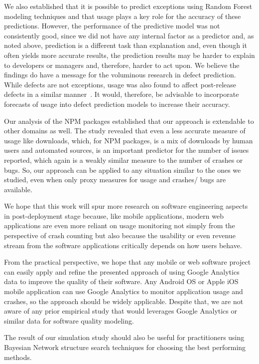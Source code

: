 \documentclass[smallcondensed]{svjour3}     %
\begin{document}
We also established
that it is possible to predict exceptions using Random Forest
modeling techniques and that usage plays a key role for the accuracy
of these predictions. However, the performance of the predictive model 
was not consistently good, since we did not have any internal factor as a 
predictor and, as noted above, prediction is a different task
than explanation and, even though it often yields more accurate
results, the prediction results may be harder to explain to
developers or managers and, therefore, harder to act upon. We
believe the findings do have a message for the voluminous research
in defect prediction. While defects are not exceptions, usage was
also found to affect post-release defects in a similar
manner~\cite{caper,hmps15,mockus2005predictors}. It would, therefore, be advisable to 
incorporate forecasts of usage into defect prediction models  to increase their accuracy.

Our analysis of the NPM packages established that our approach is extendable to other domains as well. 
The study revealed that even a less accurate measure of usage like downloads, which, for NPM packages, 
is a mix of downloads by human users and automated sources, is an important predictor for the number 
of issues reported, which again is a weakly similar measure to the number of crashes or bugs. 
So, our approach can be applied to any situation similar to the ones we studied, even when only 
proxy measures for usage and crashes/ bugs are available.

We hope that this work will spur more research on software engineering
aspects in post-deployment stage because, like mobile applications, 
modern web applications are even more reliant on usage monitoring not
simply from the perspective of crash counting but also because the
usability or even revenue stream from the software applications
critically depends on how users behave. 

From the practical perspective, we hope that any mobile or web
software project can easily apply and refine the presented approach
of using Google Analytics data to improve the quality of their
software.  Any Android OS or Apple iOS mobile application can use
Google Analytics to monitor application usage and crashes, so the
approach should be widely applicable. Despite that, we 
are not aware of any prior empirical study that would leverages Google
Analytics or similar data for software quality modeling.

The result of our simulation study should also be useful for practitioners 
using Bayesian Network structure search techniques for choosing the best performing methods.
\end{document}
